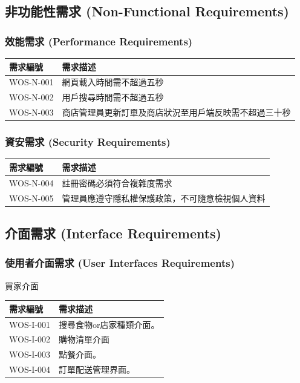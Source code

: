 \documentclass[a4paper, 12pt]{article}
\begin{document}
\subsection{非功能性需求 (Non-Functional Requirements)}
\subsubsection{效能需求 (Performance Requirements)}
\noindent\begin{tabular}{|l| p{32em}|}
    \hline
    需求編號 & 需求描述 \\
    \hline
    WOS-N-001 & 網頁載入時間需不超過五秒 \\
    \hline
    WOS-N-002 & 用戶搜尋時間需不超過五秒 \\
    \hline
    WOS-N-003 & 商店管理員更新訂單及商店狀況至用戶端反映需不超過三十秒 \\
    \hline
\end{tabular}
\subsubsection{資安需求 (Security Requirements)}
\noindent\begin{tabular}{ | p{6.5em} | p{32em} |}
    \hline
    需求編號 & 需求描述 \\
    \hline
    WOS-N-004 & 註冊密碼必須符合複雜度需求 \\
    \hline
    WOS-N-005 & 管理員應遵守隱私權保護政策，不可隨意檢視個人資料 \\
    \hline
\end{tabular}
\subsection{介面需求 (Interface Requirements)}
\subsubsection{使用者介面需求 (User Interfaces Requirements)}
\setlength{\parindent}{2em} 買家介面
\begin{center}
\noindent\begin{tabular}{ | p{6.5em} | p{32em} |}
    \hline
    需求編號 & 需求描述 \\ 
    \hline
    WOS-I-001 & 搜尋食物or店家種類介面。\\
    \hline
    WOS-I-002 & 購物清單介面\\
    \hline
    WOS-I-003 & 點餐介面。\\
    \hline
    WOS-I-004 & 訂單配送管理界面。\\
    \hline
    \end{tabular}
\end{center}
\end{document}
